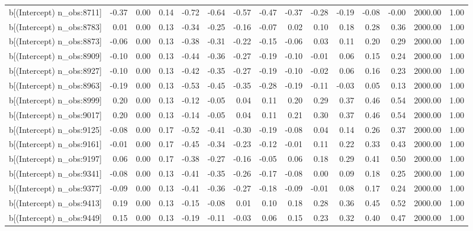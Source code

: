 \begin{table}[ht]
\begin{tabular}{rrrrrrrrrrrrrrr}
  b[(Intercept) n\_obs:8711] & -0.37 & 0.00 & 0.14 & -0.72 & -0.64 & -0.57 & -0.47 & -0.37 & -0.28 & -0.19 & -0.08 & -0.00 & 2000.00 & 1.00 \\ 
  b[(Intercept) n\_obs:8783] & 0.01 & 0.00 & 0.13 & -0.34 & -0.25 & -0.16 & -0.07 & 0.02 & 0.10 & 0.18 & 0.28 & 0.36 & 2000.00 & 1.00 \\ 
  b[(Intercept) n\_obs:8873] & -0.06 & 0.00 & 0.13 & -0.38 & -0.31 & -0.22 & -0.15 & -0.06 & 0.03 & 0.11 & 0.20 & 0.29 & 2000.00 & 1.00 \\ 
  b[(Intercept) n\_obs:8909] & -0.10 & 0.00 & 0.13 & -0.44 & -0.36 & -0.27 & -0.19 & -0.10 & -0.01 & 0.06 & 0.15 & 0.24 & 2000.00 & 1.00 \\ 
  b[(Intercept) n\_obs:8927] & -0.10 & 0.00 & 0.13 & -0.42 & -0.35 & -0.27 & -0.19 & -0.10 & -0.02 & 0.06 & 0.16 & 0.23 & 2000.00 & 1.00 \\ 
  b[(Intercept) n\_obs:8963] & -0.19 & 0.00 & 0.13 & -0.53 & -0.45 & -0.35 & -0.28 & -0.19 & -0.11 & -0.03 & 0.05 & 0.13 & 2000.00 & 1.00 \\ 
  b[(Intercept) n\_obs:8999] & 0.20 & 0.00 & 0.13 & -0.12 & -0.05 & 0.04 & 0.11 & 0.20 & 0.29 & 0.37 & 0.46 & 0.54 & 2000.00 & 1.00 \\ 
  b[(Intercept) n\_obs:9017] & 0.20 & 0.00 & 0.13 & -0.14 & -0.05 & 0.04 & 0.11 & 0.21 & 0.30 & 0.37 & 0.46 & 0.54 & 2000.00 & 1.00 \\ 
  b[(Intercept) n\_obs:9125] & -0.08 & 0.00 & 0.17 & -0.52 & -0.41 & -0.30 & -0.19 & -0.08 & 0.04 & 0.14 & 0.26 & 0.37 & 2000.00 & 1.00 \\ 
  b[(Intercept) n\_obs:9161] & -0.01 & 0.00 & 0.17 & -0.45 & -0.34 & -0.23 & -0.12 & -0.01 & 0.11 & 0.22 & 0.33 & 0.43 & 2000.00 & 1.00 \\ 
  b[(Intercept) n\_obs:9197] & 0.06 & 0.00 & 0.17 & -0.38 & -0.27 & -0.16 & -0.05 & 0.06 & 0.18 & 0.29 & 0.41 & 0.50 & 2000.00 & 1.00 \\ 
  b[(Intercept) n\_obs:9341] & -0.08 & 0.00 & 0.13 & -0.41 & -0.35 & -0.26 & -0.17 & -0.08 & 0.00 & 0.09 & 0.18 & 0.25 & 2000.00 & 1.00 \\ 
  b[(Intercept) n\_obs:9377] & -0.09 & 0.00 & 0.13 & -0.41 & -0.36 & -0.27 & -0.18 & -0.09 & -0.01 & 0.08 & 0.17 & 0.24 & 2000.00 & 1.00 \\ 
  b[(Intercept) n\_obs:9413] & 0.19 & 0.00 & 0.13 & -0.15 & -0.08 & 0.01 & 0.10 & 0.18 & 0.28 & 0.36 & 0.45 & 0.52 & 2000.00 & 1.00 \\ 
  b[(Intercept) n\_obs:9449] & 0.15 & 0.00 & 0.13 & -0.19 & -0.11 & -0.03 & 0.06 & 0.15 & 0.23 & 0.32 & 0.40 & 0.47 & 2000.00 & 1.00 \\ 

\end{tabular}
\end{table}
